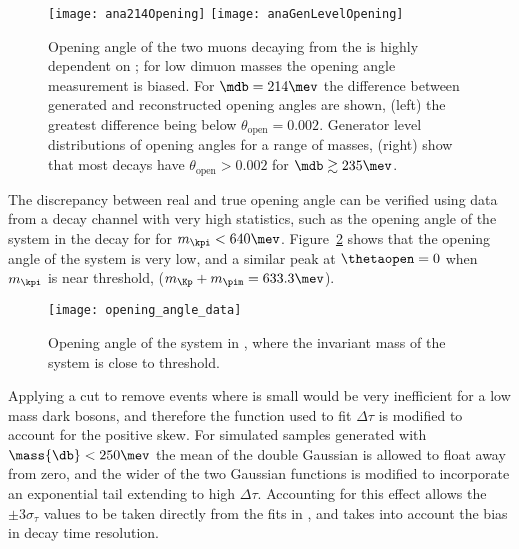 \begin{figure}
  \begin{center}
    \texttt{[image: ana214Opening]}
    \texttt{[image: anaGenLevelOpening]}\\
  \end{center}
  \caption{\small
    Opening angle of the two muons decaying from the \db is highly dependent on \mdb; for low
    dimuon masses the opening angle measurement is biased.
    For $\mdb=214\mev$ the difference between generated and reconstructed opening angles are shown,
    (left) the greatest difference being below $\theta_\mathrm{open}=0.002$.
    Generator level distributions of opening angles for a range of masses,
    (right) show that most \db decays have $\theta_\mathrm{open}>0.002$ for
    $\mdb\gtrsim235\mev$.
  }
  \label{fig:opening:gen}
\end{figure}

The discrepancy between real and true opening angle can be verified using data
from a decay channel with very high statistics, such as the opening angle of the \kpi system in
the decay \decay{\Bd}{\kpi\mumu} for for $m_{\kpi}<640\mev$.
Figure~\ref{fig:db:openkpi} shows that the opening angle of the \kpi system
is very low, and a similar peak at $\thetaopen=0$ when $m_{\kpi}$ is near threshold,
($m_{\Kp} + m_{\pim} = 633.3\mev$).

\begin{figure}
  \begin{center}
    \texttt{[image: opening\_angle\_data]}
    \caption[Opening angle of \kpi]
    {
      Opening angle of the \kpi system in \decay{\Bd}{\kpi\mumu}, where the invariant mass of the
      \kpi system is close to threshold.
    }
    \label{fig:db:openkpi}
  \end{center}
\end{figure}

Applying a cut to remove events where \thetaopen is small would be very inefficient for a low mass
dark bosons, and therefore the function used to fit $\Delta\tau$ is modified to account for the positive
skew.
For simulated samples generated with $\mass{\db}<250\mev$ the mean of the double Gaussian is
allowed to float away from zero, and the wider of the two Gaussian functions
is modified to incorporate an exponential tail
extending to high $\Delta\tau$.
Accounting for this effect allows the $\pm3\sigma_\tau$ values to be taken directly from the fits
in , and takes into account the bias in decay time resolution.

